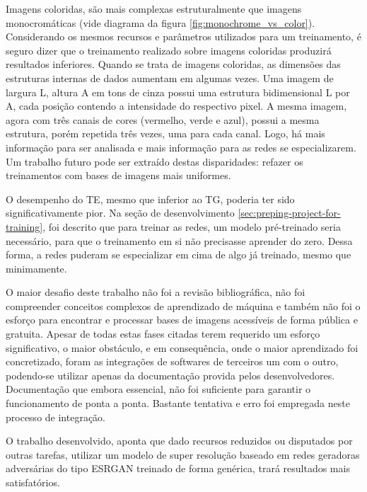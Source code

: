 Imagens coloridas, são mais complexas estruturalmente que imagens monocromáticas (vide diagrama da figura \ref{fig:monochrome_vs_color}). Considerando os mesmos recursos e parâmetros utilizados para um treinamento, é seguro dizer que o treinamento realizado sobre imagens coloridas produzirá resultados inferiores. Quando se trata de imagens coloridas, as dimensões das estruturas internas de dados aumentam em algumas vezes. Uma imagem de largura L, altura A em tons de cinza possui uma estrutura bidimensional L por A, cada posição contendo a intensidade do respectivo pixel. A mesma imagem, agora com três canais de cores (vermelho, verde e azul), possui a mesma estrutura, porém repetida três vezes, uma para cada canal. Logo, há mais informação para ser analisada e mais informação para as redes se especializarem. Um trabalho futuro pode ser extraído destas disparidades: refazer os treinamentos com bases de imagens mais uniformes.

O desempenho do TE, mesmo que inferior ao TG, poderia ter sido significativamente pior. Na seção de desenvolvimento \ref{sec:preping-project-for-training}, foi descrito que para treinar as redes, um modelo pré-treinado seria necessário, para que o treinamento em si não precisasse aprender do zero. Dessa forma, a redes puderam se especializar em cima de algo já treinado, mesmo que minimamente. 

O maior desafio deste trabalho não foi a revisão bibliográfica, não foi compreender conceitos complexos de aprendizado de máquina e também não foi o esforço para encontrar e processar bases de imagens acessíveis de forma pública e gratuita. Apesar de todas estas fases citadas terem requerido um esforço significativo, o maior obstáculo, e em consequência, onde o maior aprendizado foi concretizado, foram as integrações de softwares de terceiros um com o outro, podendo-se utilizar apenas da documentação provida pelos desenvolvedores. Documentação que embora essencial, não foi suficiente para garantir o funcionamento de ponta a ponta. Bastante tentativa e erro foi empregada neste processo de integração. 

O trabalho desenvolvido, aponta que dado recursos reduzidos ou disputados por outras tarefas, utilizar um modelo de super resolução baseado em redes geradoras adversárias do tipo ESRGAN treinado de forma genérica, trará resultados mais satisfatórios.


